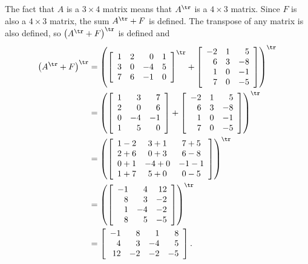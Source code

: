 \begin{example}
\item The fact that $A$ is a $3 \times 4$ matrix means that $A^{\tr}$ is a $4 \times 3$ matrix. Since $F$ is also a $4 \times 3$ matrix, the sum $A^{\tr}+F$ is defined. The transpose of any matrix is also defined, so $\left(A^{\tr}+F\right)^{\tr}$ is defined and 
\begin{align*}
\left(A^{\tr}+F\right)^{\tr} &= \left( \left[ \begin{array}{ccrc} 1&2&0&1\\3&0&-4&5\\7&6&-1&0 \end{array} \right]^{\tr} +  \left[ \begin{array}{rcr} -2&1&5\\6&3&-8\\1&0&-1\\ 7&0&-5 \end{array} \right] \right)^{\tr} \\
	&= \left( \left[ \begin{array}{crr} 1&3&7\\2&0&6\\0&-4&-1 \\ 1&5&0 \end{array} \right] + \left[ \begin{array}{rcr} -2&1&5\\6&3&-8\\1&0&-1\\ 7&0&-5 \end{array} \right] \right)^{\tr} \\
	&= \left( \left[ \begin{array}{ccc} 1-2&3+1&7+5\\2+6&0+3&6-8\\0+1&-4+0&-1-1 \\ 1+7&5+0&0-5 \end{array} \right] \right)^{\tr} \\
	&= \left( \left[ \begin{array}{rrr} -1&4&12\\8&3&-2\\1&-4&-2 \\ 8&5&-5 \end{array} \right] \right)^{\tr} \\
	&= \left[ \begin{array}{rrrr} -1&8&1&8\\4&3&-4&5\\ 12&-2&-2&-5 \end{array} \right].
\end{align*}

\ea

\end{example} 

